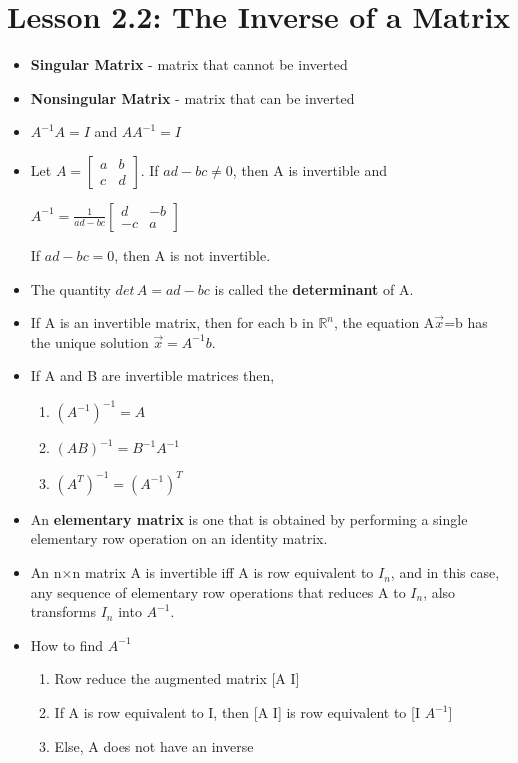 \documentclass{report}
\newcommand{\Ax}{A$\vec{x}$}
\newcommand{\nxn}{n$\times$n}
\newcommand{\Rn}{$\mathbb{R}^n$}
\begin{document}
\section{Lesson 2.2: The Inverse of a Matrix}
	\begin{itemize}\addtolength{\leftskip}{2em}
		\item \textbf{Singular Matrix} - matrix that cannot be inverted
		\item \textbf{Nonsingular Matrix} - matrix that can be inverted
		\item $A^{-1}A=I$ and $AA^{-1}=I$
		\item Let $A= \begin{bmatrix}
		a & b\\
		c & d
		\end{bmatrix}$. If $ad-bc \ne 0$, then A is invertible and
		\begin{center}
		$A^{-1}=\frac{1}{ad-bc}\begin{bmatrix}
		d & -b\\
		-c & a
		\end{bmatrix}$
		\end{center}
		If $ad-bc=0$, then A is not invertible.
		\item The quantity $det\,A = ad-bc$ is called the \textbf{determinant} of A.
		\item If A is an invertible matrix, then for each b in \Rn, the equation \Ax=b has the unique solution $\vec{x}=A^{-1}b$.
		\item If A and B are invertible matrices then,
		\begin{enumerate}\addtolength{\leftskip}{4em}
			\item $(A^{-1})^{-1}=A$
			\item $(AB)^{-1}=B^{-1}A^{-1}$
			\item $(A^T)^{-1}=(A^{-1})^T$
		\end{enumerate}
		\item An \textbf{elementary matrix} is one that is obtained by performing a single elementary row operation on an identity matrix.
		\item An {\nxn} matrix A is invertible iff A is row equivalent to $I_{n}$, and in this case, any sequence of elementary row operations that reduces A to $I_{n}$, also transforms $I_{n}$ into $A^{-1}$.
		\item How to find $A^{-1}$
		\begin{enumerate}\addtolength{\leftskip}{4em}
		\item Row reduce the augmented matrix [A  I]
		\item If A is row equivalent to I, then [A  I] is row equivalent to [I  $A^{-1}$]
		\item Else, A  does not have an inverse
		\end{enumerate}
	\end{itemize}
\end{document}

